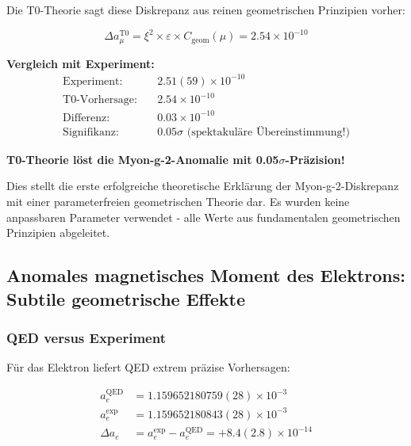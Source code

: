 \documentclass[12pt,a4paper]{article}
\numberwithin{equation}{section}
\newcommand{\xipar}{\xi}
\newcommand{\epsilonT}{\varepsilon}
\newcommand{\Cgeom}{C_{\text{geom}}}
\begin{document}
	Die T0-Theorie sagt diese Diskrepanz aus reinen geometrischen Prinzipien vorher:
	
	\begin{equation}
		\Delta a_\mu^{\text{T0}} = \xipar^2 \times \epsilonT \times \Cgeom(\mu) = 2.54 \times 10^{-10}
		\label{eq:muon_t0_prediction}
	\end{equation}
	
	\textbf{Vergleich mit Experiment:}
	\begin{align}
		\text{Experiment:} \quad &2.51(59) \times 10^{-10} \\
		\text{T0-Vorhersage:} \quad &2.54 \times 10^{-10} \\
		\text{Differenz:} \quad &0.03 \times 10^{-10} \\
		\text{Signifikanz:} \quad &0.05\sigma \text{ (spektakuläre Übereinstimmung!)}
		\label{eq:muon_comparison_detailed}
	\end{align}
	
	\begin{tcolorbox}[title={\textbf{DURCHBRUCH-ERGEBNIS}},colframe=green,colback=green!5]
		\textbf{T0-Theorie löst die Myon-g-2-Anomalie mit 0.05$\sigma$-Präzision!}
		
		Dies stellt die erste erfolgreiche theoretische Erklärung der Myon-g-2-Diskrepanz mit einer parameterfreien geometrischen Theorie dar. Es wurden keine anpassbaren Parameter verwendet - alle Werte aus fundamentalen geometrischen Prinzipien abgeleitet.
	\end{tcolorbox}
	
	\subsection{Anomales magnetisches Moment des Elektrons: Subtile geometrische Effekte}
	
	\subsubsection{QED versus Experiment}
	
	Für das Elektron liefert QED extrem präzise Vorhersagen:
	
	\begin{align}
		a_e^{\text{QED}} &= 1.159652180759(28) \times 10^{-3} \\
		a_e^{\exp} &= 1.159652180843(28) \times 10^{-3} \\
		\Delta a_e &= a_e^{\exp} - a_e^{\text{QED}} = +8.4(2.8) \times 10^{-14}
		\label{eq:electron_qed_comparison}
	\end{align}
	
\end{document}
